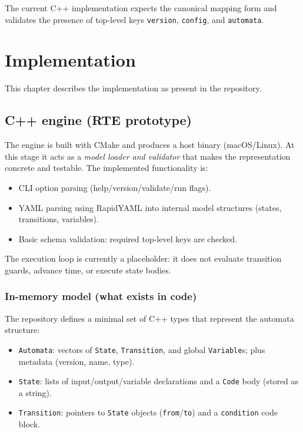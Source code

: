 The current C++ implementation expects the canonical mapping form and validates the presence of top-level keys \texttt{version}, \texttt{config}, and \texttt{automata}.

\chapter{Implementation}
\label{ch:implementation}

This chapter describes the implementation as present in the repository.

\section{C++ engine (RTE prototype)}

The engine is built with CMake and produces a host binary (macOS/Linux).
At this stage it acts as a \emph{model loader and validator} that makes the representation concrete and testable.
The implemented functionality is:
\begin{itemize}
  \item CLI option parsing (help/version/validate/run flags).
  \item YAML parsing using RapidYAML into internal model structures (states, transitions, variables).
  \item Basic schema validation: required top-level keys are checked.
\end{itemize}

The execution loop is currently a placeholder: it does not evaluate transition guards, advance time, or execute state bodies.

\subsection{In-memory model (what exists in code)}

The repository defines a minimal set of C++ types that represent the automata structure:
\begin{itemize}
  \item \texttt{Automata}: vectors of \texttt{State}, \texttt{Transition}, and global \texttt{Variable}s; plus metadata (version, name, type).
  \item \texttt{State}: lists of input/output/variable declarations and a \texttt{Code} body (stored as a string).
  \item \texttt{Transition}: pointers to \texttt{State} objects (\texttt{from}/\texttt{to}) and a \texttt{condition} code block.
\end{itemize}

